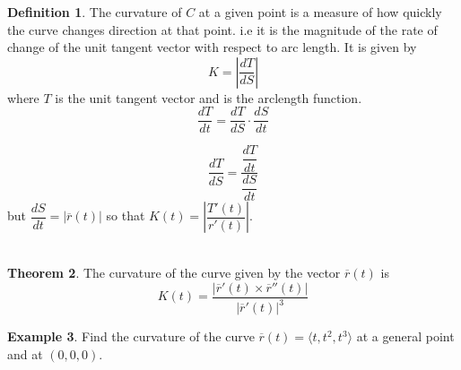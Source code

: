 \documentclass[11pt,a4paper]{article}
\theoremstyle{definition}
\newtheorem{thm}{Theorem}[subsection]
\newtheorem{defn}[thm]{Definition}
\newtheorem{exa}[thm]{Example}
\begin{document}
\begin{defn}


The curvature of $C$ at a given point is a measure of how quickly the curve changes direction at that point. i.e it is the magnitude of the rate of change of the unit tangent vector with respect to arc length. It is given by $$K = \left|\dfrac{d T}{d S}\right|$$ where $T$ is the unit tangent vector and is the arclength function. $$\frac{d T}{d t} = \frac{d T}{d S}\cdot\frac{d S}{dt}$$

$$\frac{dT}{dS} = \frac{\dfrac{dT}{dt}}{\dfrac{dS}{dt}}$$ but $\dfrac{dS}{d t} = \left|\overline{r}(t)\right|$ so that $K(t) = \left|\dfrac{T'(t)}{r'(t)}\right|$.\\\\
\end{defn}

\begin{thm}


The curvature of the curve given by the vector $\overline{r}(t)$ is $$K(t) = \frac{\left|\overline{r}'(t)\times \overline{r}''(t)\right|
}{\left|\overline{r}'(t)\right|^3
}$$
\end{thm}


\begin{exa}


Find the curvature of the curve $\overline{r}(t) = \big\langle t, t^2 , t^3\big\rangle$ at a  general point and at $(0,0,0)$.
\end{exa}
\end{document}
